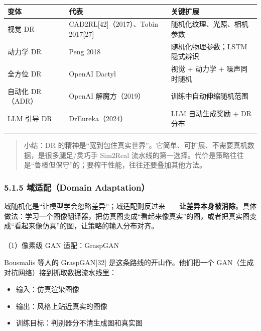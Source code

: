 \documentclass[
  chinese,
]{ctexart}
\makeatletter
\let\oldparagraph\paragraph
\renewcommand{\paragraph}{
    \@ifstar
      \xxxParagraphStar
      \xxxParagraphNoStar
  }
\newcommand{\xxxParagraphStar}[1]{\oldparagraph*{#1}\mbox{}}
\newcommand{\xxxParagraphNoStar}[1]{\oldparagraph{#1}\mbox{}}
\providecommand{\tightlist}{%
  \setlength{\itemsep}{0pt}\setlength{\parskip}{0pt}}
\makeatother
\begin{document}
\begin{center}
\begin{tabular}{@{}>{\raggedright\arraybackslash}p{} >{\raggedright\arraybackslash}p{} >{\raggedright\arraybackslash}p{}@{}}
\toprule\noalign{}
变体 & 代表 & 关键扩展 \\
\midrule\noalign{}
视觉 DR & CAD2RL{[}42{]}（2017）、Tobin 2017{[}27{]} & 随机化纹理、光照、相机参数 \\
动力学 DR & Peng 2018 & 随机化物理参数；LSTM 隐式辨识 \\
全方位 DR & OpenAI Dactyl & 视觉 + 动力学 + 噪声同时随机 \\
自动化 DR（ADR） & OpenAI 解魔方（2019） & 训练中自动伸缩随机范围 \\
LLM 引导 DR & DrEureka（2024） & LLM 自动生成奖励 + DR 分布 \\
\bottomrule\noalign{}
\end{tabular}
\end{center}

\begin{quote}
小结：DR
的精神是``宽到包住真实世界''。它简单、可扩展、不需要真机数据，是很多腿足/灵巧手
Sim2Real
流水线的第一选择。代价是策略往往是``鲁棒但保守''的；要榨干性能，往往还要叠加其他方法。
\end{quote}

\subsubsection{5.1.5 域适配（Domain
Adaptation）}\label{ux57dfux9002ux914ddomain-adaptation}

域随机化是``让模型学会忽略差异''；域适配则反过来------\textbf{让差异本身被消除}。具体做法：学习一个图像翻译器，把仿真图变成``看起来像真实''的图，或者把真实图变成``看起来像仿真''的图，让策略的输入分布对齐。

\paragraph{（1）像素级 GAN
适配：GraspGAN}\label{ux50cfux7d20ux7ea7-gan-ux9002ux914dgraspgan}

Bousmalis 等人的 GraspGAN{[}32{]} 是这条路线的开山作。他们把一个
GAN（生成对抗网络）接到抓取数据流水线里：

\begin{itemize}
\tightlist
\item
  输入：仿真渲染图像
\item
  输出：风格上贴近真实的图像
\item
  训练目标：判别器分不清生成图和真实图
\end{itemize}
\end{document}
